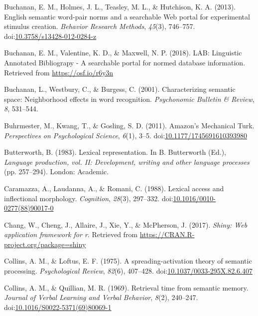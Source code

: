 \documentclass[english,,man]{apa6}
\theoremstyle{definition}
\theoremstyle{definition}
\theoremstyle{definition}
\theoremstyle{remark}
\begin{document}
\leavevmode\hypertarget{ref-Buchanan2013}{}%
Buchanan, E. M., Holmes, J. L., Teasley, M. L., \& Hutchison, K. A.
(2013). English semantic word-pair norms and a searchable Web portal for
experimental stimulus creation. \emph{Behavior Research Methods},
\emph{45}(3), 746--757.
doi:\href{https://doi.org/10.3758/s13428-012-0284-z}{10.3758/s13428-012-0284-z}

\leavevmode\hypertarget{ref-Buchanan2018}{}%
Buchanan, E. M., Valentine, K. D., \& Maxwell, N. P. (2018). LAB:
Linguistic Annotated Bibliograpy - A searchable portal for normed
database information. Retrieved from \url{https://osf.io/r6y3n}

\leavevmode\hypertarget{ref-Buchanan2001}{}%
Buchanan, L., Westbury, C., \& Burgess, C. (2001). Characterizing
semantic space: Neighborhood effects in word recognition.
\emph{Psychonomic Bulletin \& Review}, \emph{8}, 531--544.

\leavevmode\hypertarget{ref-Buhrmester2011}{}%
Buhrmester, M., Kwang, T., \& Gosling, S. D. (2011). Amazon's Mechanical
Turk. \emph{Perspectives on Psychological Science}, \emph{6}(1), 3--5.
doi:\href{https://doi.org/10.1177/1745691610393980}{10.1177/1745691610393980}

\leavevmode\hypertarget{ref-Butterworth1983}{}%
Butterworth, B. (1983). Lexical representation. In B. Butterworth (Ed.),
\emph{Language production, vol. II: Development, writing and other
language processes} (pp. 257--294). London: Academic.

\leavevmode\hypertarget{ref-Caramazza1988}{}%
Caramazza, A., Laudanna, A., \& Romani, C. (1988). Lexical access and
inflectional morphology. \emph{Cognition}, \emph{28}(3), 297--332.
doi:\href{https://doi.org/10.1016/0010-0277(88)90017-0}{10.1016/0010-0277(88)90017-0}

\leavevmode\hypertarget{ref-R-shiny}{}%
Chang, W., Cheng, J., Allaire, J., Xie, Y., \& McPherson, J. (2017).
\emph{Shiny: Web application framework for r}. Retrieved from
\url{https://CRAN.R-project.org/package=shiny}

\leavevmode\hypertarget{ref-Collins1975}{}%
Collins, A. M., \& Loftus, E. F. (1975). A spreading-activation theory
of semantic processing. \emph{Psychological Review}, \emph{82}(6),
407--428.
doi:\href{https://doi.org/10.1037/0033-295X.82.6.407}{10.1037/0033-295X.82.6.407}

\leavevmode\hypertarget{ref-Collins1969}{}%
Collins, A. M., \& Quillian, M. R. (1969). Retrieval time from semantic
memory. \emph{Journal of Verbal Learning and Verbal Behavior},
\emph{8}(2), 240--247.
doi:\href{https://doi.org/10.1016/S0022-5371(69)80069-1}{10.1016/S0022-5371(69)80069-1}
\end{document}
